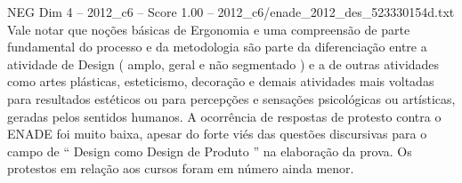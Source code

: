 \begin{textsample}{NEG Dim 4 – 2012\_c6 – Score 1.00 – 2012\_c6/enade\_2012\_des\_523330154d.txt}
Vale notar que noções básicas de Ergonomia e uma compreensão de parte fundamental do processo e da metodologia são parte da diferenciação entre a atividade de Design ( amplo, geral e não segmentado ) e a de outras atividades como artes plásticas, esteticismo, decoração e demais atividades mais voltadas para resultados estéticos ou para percepções e sensações psicológicas ou artísticas, geradas pelos sentidos humanos.
A ocorrência de respostas de protesto contra o ENADE foi muito baixa, apesar do forte viés das questões discursivas para o campo de “ Design como Design de Produto ” na elaboração da prova.
Os protestos em relação aos cursos foram em número ainda menor.

\end{textsample}
